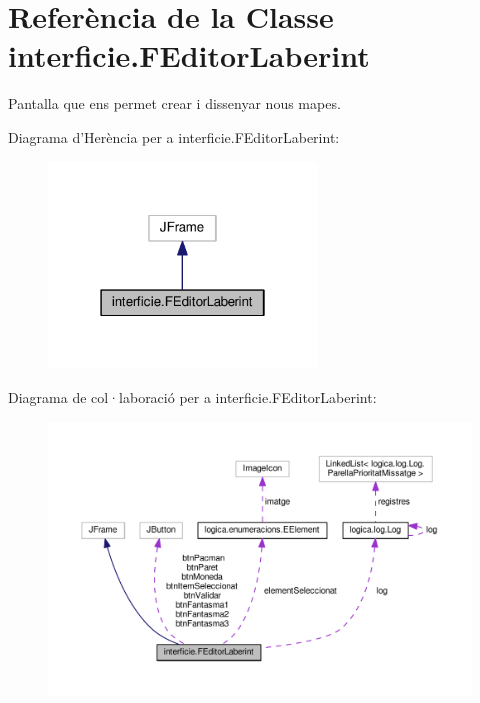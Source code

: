 \hypertarget{classinterficie_1_1_f_editor_laberint}{\section{Referència de la Classe interficie.\+F\+Editor\+Laberint}
\label{classinterficie_1_1_f_editor_laberint}
}


Pantalla que ens permet crear i dissenyar nous mapes.  




Diagrama d'Herència per a interficie.\+F\+Editor\+Laberint\+:
\nopagebreak
\begin{figure}[H]
\begin{center}
\leavevmode
\includegraphics[width=202pt]{classinterficie_1_1_f_editor_laberint__inherit__graph}
\end{center}
\end{figure}


Diagrama de col·laboració per a interficie.\+F\+Editor\+Laberint\+:
\nopagebreak
\begin{figure}[H]
\begin{center}
\leavevmode
\includegraphics[width=350pt]{classinterficie_1_1_f_editor_laberint__coll__graph}
\end{center}
\end{figure}
